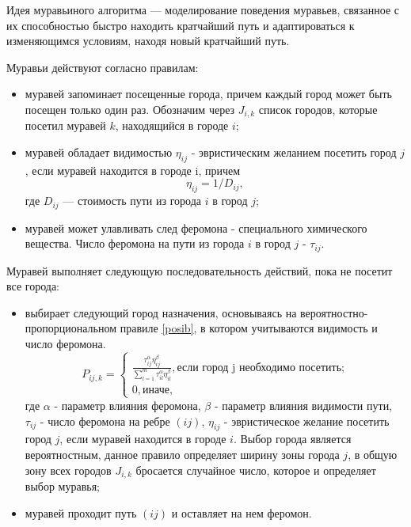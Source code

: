 Идея муравьиного алгоритма \cite{ant} — моделирование поведения муравьев, связанное с их способностью быстро находить кратчайший путь и адаптироваться к изменяющимся условиям, находя новый кратчайший путь.

Муравьи действуют согласно правилам:
\begin{itemize}
	\item муравей запоминает посещенные города, причем каждый город может быть посещен только один раз. Обозначим через $J_{i,k}$ список городов, которые посетил муравей $k$, находящийся в городе $i$;
	\item муравей обладает видимостью $\eta_{ij}$ - эвристическим желанием посетить город $j$, если муравей находится в городе i, причем
\begin{equation}
	\label{d_func}
	\eta_{ij} = 1 / D_{ij},
\end{equation}
где $D_{ij}$ — стоимость пути из города $i$ в город $j$;
	\item муравей может улавливать след феромона - специального химического вещества. Число феромона на пути из города $i$ в город $j$ - $\tau_{ij}$.
\end{itemize}

Муравей выполняет следующую последовательность действий, пока не посетит все города:
\begin{itemize}
	\item выбирает следующий город назначения, основываясь на вероятностно-пропорциональном правиле \eqref{posib}, в котором учитываются видимость и число феромона.
\begin{equation}
	\label{posib}
	P_{ij, k} = \begin{cases}
		\frac{\tau_{ij}^\alpha\eta_{ij}^\beta}{\sum_{l=1}^m \tau^\alpha_{il}\eta^\beta_{il}}, \textrm{если город j необходимо посетить;} \\
		0, \textrm{иначе,}
	\end{cases}
\end{equation}
где $\alpha$ - параметр влияния феромона, $\beta$ - параметр влияния видимости пути, $\tau_{ij}$ - число феромона на ребре $(ij)$, $\eta_{ij}$ - эвристическое желание посетить город $j$, если муравей находится в городе $i$. Выбор города является вероятностным, данное правило определяет ширину зоны города $j$, в общую зону всех городов $J_{i,k}$ бросается случайное число, которое и определяет выбор муравья;
	\item муравей проходит путь $(ij)$ и оставляет на нем феромон.
\end{itemize}

